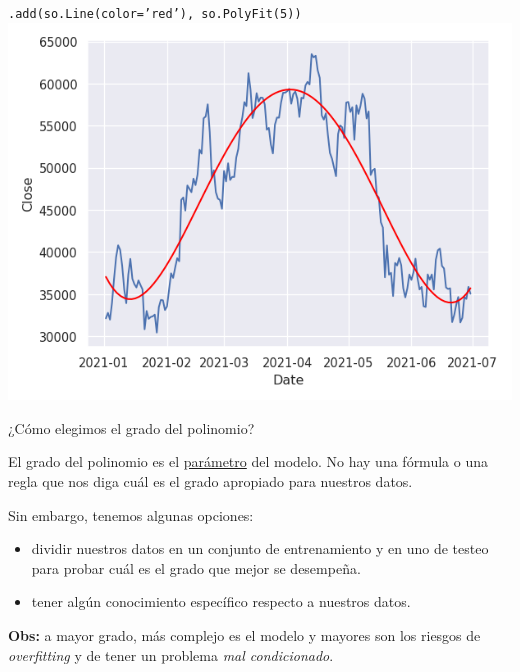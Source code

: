 \documentclass[aspectratio=169, usenames,dvipsnames]{beamer}
\begin{document}
\begin{frame}
    \centering
    \texttt{.add(so.Line(color='red'), so.PolyFit(\alert{5}))}
    \includegraphics[width=0.75\linewidth]{img/bitcoin_lsq.png}
\end{frame}

\begin{frame}
    \Large
    ¿Cómo elegimos el grado del polinomio?

    \normalsize
    El grado del polinomio es el \underline{parámetro} del modelo. No hay una fórmula o una regla que nos diga cuál es el grado apropiado para nuestros datos. 
    
    \pause
    Sin embargo, tenemos algunas opciones:
    \begin{itemize}
        \item dividir nuestros datos en un conjunto de entrenamiento y en uno de testeo para probar cuál es el grado que mejor se desempeña.
        \item tener algún conocimiento específico respecto a nuestros datos.
    \end{itemize}

    \pause
    \alert{\textbf{Obs:} a mayor grado, más complejo es el modelo y mayores son los riesgos de \textit{overfitting} y de tener un problema \textit{mal condicionado}.}
\end{frame}
\end{document}
